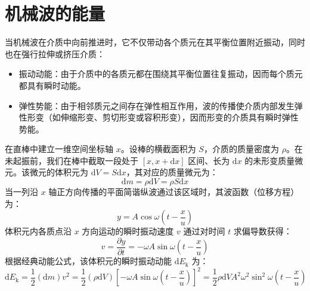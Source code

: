 \documentclass[lang=cn,11pt]{elegantbook}
\begin{document}
\section{机械波的能量}

当机械波在介质中向前推进时，它不仅带动各个质元在其平衡位置附近振动，同时也在强行拉伸或挤压介质：
\begin{itemize}
\item 振动动能：由于介质中的各质元都在围绕其平衡位置往复振动，因而每个质元都具有瞬时动能。
\item 弹性势能：由于相邻质元之间存在弹性相互作用，波的传播使介质内部发生弹性形变（如伸缩形变、剪切形变或容积形变），因而形变的介质具有瞬时弹性势能。
\end{itemize}

\begin{definition}[体积元的振动动能]
在直棒中建立一维空间坐标轴 $x$。设棒的横截面积为 $S$，介质的质量密度为 $\rho$。在未起振前，我们在棒中截取一段处于 $[x, x+\mathrm{d}x]$ 区间、长为 $\mathrm{d}x$ 的未形变质量微元。该微元的体积元为 $\mathrm{d}V = S\mathrm{d}x$，其对应的质量微元为：$$\mathrm{d}m = \rho \mathrm{d}V = \rho S \mathrm{d}x$$当一列沿 $x$ 轴正方向传播的平面简谐纵波通过该区域时，其波函数（位移方程）为：$$y = A \cos \omega \left( t - \frac{x}{u} \right)$$体积元内各质点沿 $x$ 方向运动的瞬时振动速度 $v$ 通过对时间 $t$ 求偏导数获得：$$v = \frac{\partial y}{\partial t} = -\omega A \sin \omega \left( t - \frac{x}{u} \right)$$根据经典动能公式，该体积元的瞬时振动动能 $\mathrm{d}E_{\text{k}}$ 为：$$\mathrm{d}E_{\text{k}} = \frac{1}{2}(\mathrm{d}m)v^2 = \frac{1}{2}(\rho \mathrm{d}V) \left[ -\omega A \sin \omega \left( t - \frac{x}{u} \right) \right]^2 = \frac{1}{2}\rho \mathrm{d}V A^2 \omega^2 \sin^2 \omega \left( t - \frac{x}{u} \right) $$
\end{definition}
\end{document}

